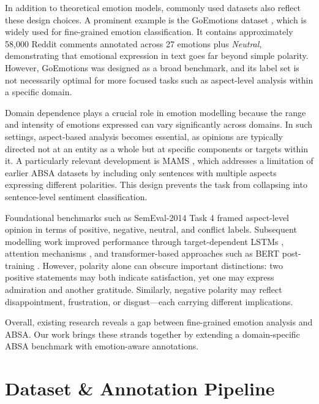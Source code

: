 \documentclass[10pt]{article}
\begin{document}
In addition to theoretical emotion models, commonly used datasets also reflect these design choices. A prominent example is the GoEmotions dataset \citep{demszky2020}, which is widely used for fine-grained emotion classification. It contains approximately 58,000 Reddit comments annotated across 27 emotions plus \emph{Neutral}, demonstrating that emotional expression in text goes far beyond simple polarity. However, GoEmotions was designed as a broad benchmark, and its label set is not necessarily optimal for more focused tasks such as aspect-level analysis within a specific domain.

Domain dependence plays a crucial role in emotion modelling because the range and intensity of emotions expressed can vary significantly across domains. In such settings, aspect-based analysis becomes essential, as opinions are typically directed not at an entity as a whole but at specific components or targets within it. A particularly relevant development is MAMS \citep{jiang2019}, which addresses a limitation of earlier ABSA datasets by including only sentences with multiple aspects expressing different polarities. This design prevents the task from collapsing into sentence-level sentiment classification.

Foundational benchmarks such as SemEval-2014 Task 4 \citep{pontiki2014} framed aspect-level opinion in terms of positive, negative, neutral, and conflict labels. Subsequent modelling work improved performance through target-dependent LSTMs \citep{tang2016}, attention mechanisms \citep{wang2016}, and transformer-based approaches such as BERT post-training \citep{xu2019}. However, polarity alone can obscure important distinctions: two positive statements may both indicate satisfaction, yet one may express admiration and another gratitude. Similarly, negative polarity may reflect disappointment, frustration, or disgust---each carrying different implications.

Overall, existing research reveals a gap between fine-grained emotion analysis and ABSA. Our work brings these strands together by extending a domain-specific ABSA benchmark with emotion-aware annotations.

\section{Dataset \& Annotation Pipeline}
\end{document}
